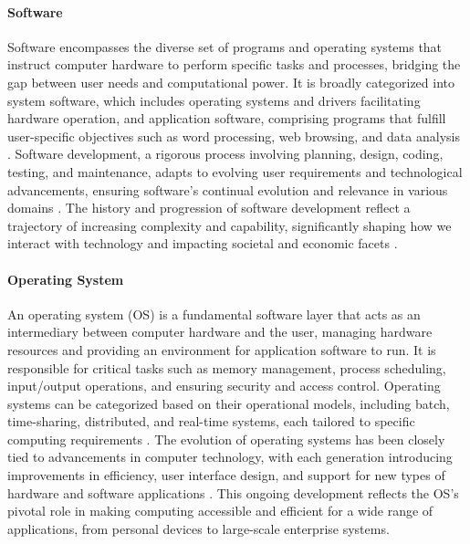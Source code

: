 \documentclass{article}
\begin{document}
\paragraph{Software}
Software encompasses the diverse set of programs and operating systems that instruct computer hardware to perform specific tasks and processes, bridging the gap between user needs and computational power. It is broadly categorized into system software, which includes operating systems and drivers facilitating hardware operation, and application software, comprising programs that fulfill user-specific objectives such as word processing, web browsing, and data analysis \cite{Sommerville2016}. Software development, a rigorous process involving planning, design, coding, testing, and maintenance, adapts to evolving user requirements and technological advancements, ensuring software's continual evolution and relevance in various domains \cite{Pressman2014}. The history and progression of software development reflect a trajectory of increasing complexity and capability, significantly shaping how we interact with technology and impacting societal and economic facets \cite{Ensmenger2012}.

\paragraph{Operating System}
An operating system (OS) is a fundamental software layer that acts as an intermediary between computer hardware and the user, managing hardware resources and providing an environment for application software to run. It is responsible for critical tasks such as memory management, process scheduling, input/output operations, and ensuring security and access control. Operating systems can be categorized based on their operational models, including batch, time-sharing, distributed, and real-time systems, each tailored to specific computing requirements \cite{TanenbaumWoodhull2006}. The evolution of operating systems has been closely tied to advancements in computer technology, with each generation introducing improvements in efficiency, user interface design, and support for new types of hardware and software applications \cite{SilberschatzGalvinGagne2018}. This ongoing development reflects the OS's pivotal role in making computing accessible and efficient for a wide range of applications, from personal devices to large-scale enterprise systems.
\end{document}
